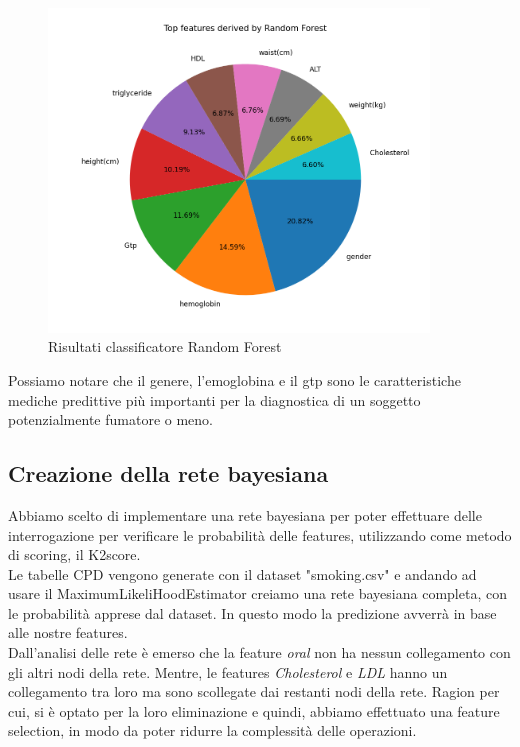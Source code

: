 \documentclass{article}
\begin{document}
\begin{figure}[H]
        \includegraphics[width=0.9\textwidth]{Grafico3}
        \centering
        \caption{Risultati classificatore Random Forest}
        \centering
\end{figure}
%

\noindent
Possiamo notare che il genere, l'emoglobina e il gtp
sono le caratteristiche mediche predittive più importanti per la diagnostica di un soggetto potenzialmente fumatore o meno.

\subsection{Creazione della rete bayesiana}
Abbiamo scelto di implementare una rete bayesiana per poter effettuare delle interrogazione per
verificare le probabilità delle features, utilizzando come metodo di scoring, il K2score.\\ 
Le tabelle CPD vengono generate con il dataset "smoking.csv" e andando ad usare il
MaximumLikeliHoodEstimator creiamo una rete bayesiana completa, con le probabilità apprese dal
dataset. In questo modo la predizione avverrà in base alle nostre features.\\
Dall'analisi delle rete è emerso che la feature \textit{oral} non ha nessun collegamento con gli altri nodi della rete. Mentre, le features \textit{Cholesterol} e \textit{LDL} hanno un collegamento tra loro ma sono scollegate dai restanti nodi della rete. Ragion per cui, si è optato per la loro eliminazione  e quindi, abbiamo effettuato una feature selection, in modo da poter ridurre la complessità delle operazioni.
%
\end{document}
